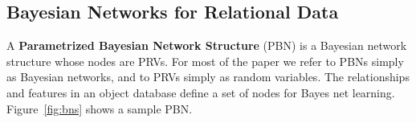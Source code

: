 \documentclass[conference]{IEEEtran}
\begin{document}
\subsection{Bayesian Networks for Relational Data}

A \textbf{Parametrized Bayesian Network Structure} (PBN) is a Bayesian network structure  whose nodes are PRVs. For most of the paper we refer to PBNs simply as Bayesian networks, and to PRVs simply as random variables. 
%
The relationships and features in an object database define a set of nodes for Bayes net learning.  Figure~\ref{fig:bns} shows a sample PBN.



\end{document}
